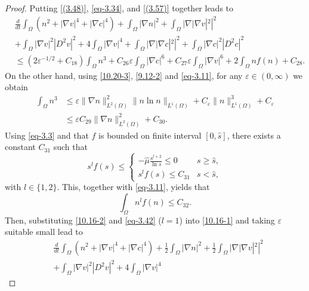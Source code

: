 \documentclass[reqno]{amsart}
\begin{document}
\begin{proof}
Putting \eqref{(3.48)}, \eqref{eq-3.34}, and \eqref{(3.57)} together leads to
\begin{equation}\label{10.16-1}
\begin{aligned}
&\frac{d}{dt} \int_{\Omega} ( n^2 + |\nabla v|^4 + |\nabla c|^4 )
+ \int_{\Omega} |\nabla n|^2
+  \int_{\Omega} |\nabla |\nabla v|^2|^2 \\
&+ \int_{\Omega} |\nabla v|^2 |D^2 v|^2
+ 4\int_{\Omega} |\nabla v|^4
+  \int_{\Omega} |\nabla |\nabla c|^2|^2
+ \int_{\Omega} |\nabla c|^2 |D^2 c|^2 \\
&\leq (2\varepsilon^{-1/2}+C_{18})\int_{\Omega} n^3
+ C_{26}\varepsilon\int_{\Omega} |\nabla c|^6 + C_{27}\varepsilon\int_{\Omega} 
|\nabla v|^6+ 2\int_{\Omega} nf(n)+C_{28}.
\end{aligned}
\end{equation}
On the other hand, using \eqref{10.20-3}, \eqref{9.12-2} and \eqref{eq-3.11}, for any 
$\varepsilon\in (0,\infty)$ we obtain
\begin{equation}\label{10.16-2}\begin{aligned}
\int_{\Omega} n^3
&\leq \varepsilon \| \nabla n \|_{L^2(\Omega)}^2 \| n\ln n \|_{L^1(\Omega)} 
 + C_\varepsilon \| n \|_{L^1(\Omega)}^3 + C_\varepsilon \\
&\leq \varepsilon C_{29} \| \nabla n \|_{L^2(\Omega)}^2  + C_{30}.
\end{aligned}
\end{equation}
Using \eqref{eq-3.3} and that $ f $ is bounded on finite interval $ [0, \hat{s}] $, 
there exists a constant $ C_{31} $ such that
\[
s^l f(s) \leq
\begin{cases}
-\hat{\mu} \frac{s^{l+2}}{\ln s} \leq 0 & s \geq \hat{s}, \\[3pt]
s^l f(s) \leq C_{31} & s < \hat{s},
\end{cases}
\]
with $l\in \{1,2\}$. This, together with \eqref{eq-3.11}, yields that
\begin{equation}\label{eq-3.42}
\int_{\Omega} n^l f(n) \leq C_{32}.
\end{equation}
Then, substituting \eqref{10.16-2} and \eqref{eq-3.42} ($l=1$) into \eqref{10.16-1} 
and taking $ \varepsilon $ suitable small lead to
\begin{equation}\label{eq-3.43}
\begin{aligned}
&\frac{d}{dt} \int_{\Omega} ( n^2 + |\nabla v|^4 + |\nabla c|^4 )
+ \frac{1}{2}\int_{\Omega} |\nabla n|^2 + \frac{1}{2}\int_{\Omega} |\nabla |\nabla v|^2|^2 \\
&+ \int_{\Omega} |\nabla v|^2 |D^2 v|^2 + 4\int_{\Omega} |\nabla v|^4

\end{aligned}
\end{equation}
\end{proof}
\end{document}
